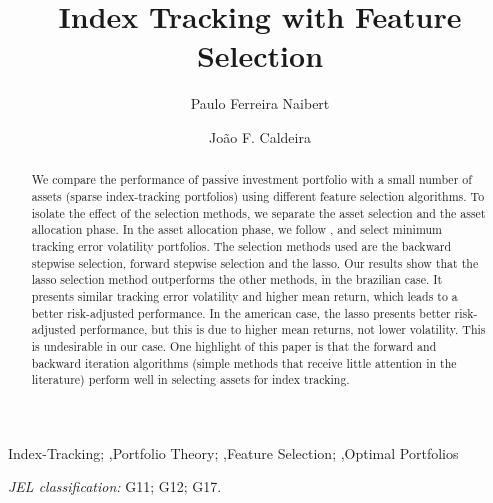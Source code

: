 \documentclass[preprint,authoryear,review,12pt]{elsarticle}
\begin{document}

\begin{frontmatter}

\title{Index Tracking with Feature Selection}%

\author[Label1]{Paulo Ferreira Naibert}
\author[Label2]{Jo\~ao F. Caldeira}
\address[Label1]{PhD Candidate at the Economics Department of the Federal University of Rio Grande do Sul}
\address[Label2]{Department of Economics, Universidade Federal de Santa Catarina}

\begin{abstract}
\noindent
We compare the performance of passive investment portfolio with a small number of assets (sparse index-tracking portfolios) using different feature selection algorithms.
To isolate the effect of the selection methods, we separate the asset selection and the asset allocation phase.
In the asset allocation phase, we follow \cite{liu-2009}, and select minimum tracking error volatility portfolios.
The selection methods used are the backward stepwise selection, forward stepwise selection and the lasso.
Our results show that the lasso selection method outperforms the other methods, in the brazilian case.
It presents similar tracking error volatility and higher mean return, which leads to a better risk-adjusted performance.
In the american case, the lasso presents better risk-adjusted performance, but this is due to higher mean returns, not lower volatility.
This is undesirable in our case.
One highlight of this paper is that the forward and backward iteration algorithms (simple methods that receive little attention in the literature) perform well in selecting assets for index tracking.
\end{abstract}


\begin{keyword}
Index-Tracking; \sep Portfolio Theory; \sep Feature Selection; \sep Optimal Portfolios 

\noindent\textit{JEL classification:} G11; G12; G17.
\end{keyword}

\end{frontmatter}
\end{document}
